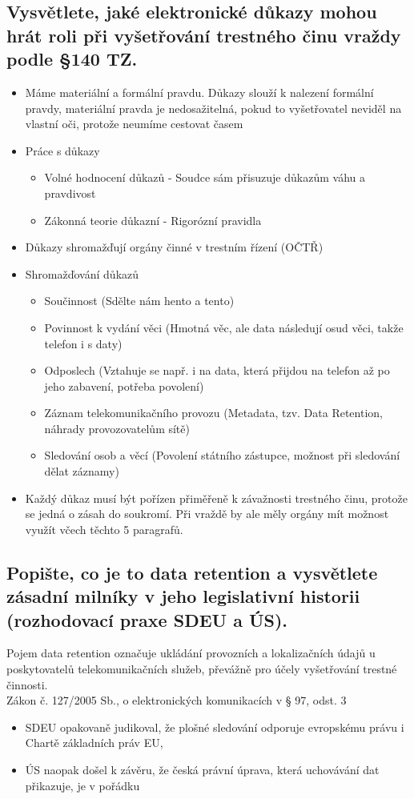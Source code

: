 \subsection{Vysvětlete, jaké elektronické důkazy mohou hrát roli při vyšetřování trestného činu vraždy podle §140 TZ.}
\begin{itemize}
    \item Máme materiální a formální pravdu. Důkazy slouží k nalezení formální pravdy, materiální pravda je nedosažitelná, pokud to vyšetřovatel neviděl na vlastní oči, protože neumíme cestovat časem
    \item Práce s důkazy
          \begin{itemize}
              \item Volné hodnocení důkazů - Soudce sám přisuzuje důkazům váhu a pravdivost
              \item Zákonná teorie důkazní - Rigorózní pravidla
          \end{itemize}
    \item Důkazy shromažďují orgány činné v trestním řízení (OČTŘ)
    \item Shromažďování důkazů
          \begin{itemize}
              \item Součinnost (Sdělte nám hento a tento)
              \item Povinnost k vydání věci (Hmotná věc, ale data následují osud věci, takže telefon i s daty)
              \item Odposlech (Vztahuje se např. i na data, která přijdou na telefon až po jeho zabavení, potřeba povolení)
              \item Záznam telekomunikačního provozu (Metadata, tzv. Data Retention, náhrady provozovatelům sítě)
              \item Sledování osob a věcí (Povolení státního zástupce, možnost při sledování dělat záznamy)
          \end{itemize}
    \item Každý důkaz musí být pořízen přiměřeně k závažnosti trestného činu, protože se jedná o zásah do soukromí. Při vraždě by ale měly orgány mít možnost využít včech těchto 5 paragrafů.
\end{itemize}


\subsection{Popište, co je to data retention a vysvětlete zásadní milníky v jeho legislativní historii (rozhodovací praxe SDEU a ÚS).}

Pojem data retention označuje ukládání provozních a lokalizačních údajů u poskytovatelů telekomunikačních služeb, převážně pro účely vyšetřování trestné činnosti.\\
Zákon č. 127/2005 Sb., o elektronických komunikacích v § 97, odst. 3
\begin{itemize}
    \item SDEU opakovaně judikoval, že plošné sledování odporuje evropskému právu i Chartě základních práv EU,
    \item ÚS naopak došel k závěru, že česká právní úprava, která uchovávání dat přikazuje, je v pořádku
\end{itemize}
